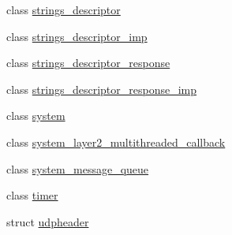 \begin{DoxyCompactItemize}
\item 
class \hyperlink{classavdecc__lib_1_1strings__descriptor}{strings\+\_\+descriptor}
\item 
class \hyperlink{classavdecc__lib_1_1strings__descriptor__imp}{strings\+\_\+descriptor\+\_\+imp}
\item 
class \hyperlink{classavdecc__lib_1_1strings__descriptor__response}{strings\+\_\+descriptor\+\_\+response}
\item 
class \hyperlink{classavdecc__lib_1_1strings__descriptor__response__imp}{strings\+\_\+descriptor\+\_\+response\+\_\+imp}
\item 
class \hyperlink{classavdecc__lib_1_1system}{system}
\item 
class \hyperlink{classavdecc__lib_1_1system__layer2__multithreaded__callback}{system\+\_\+layer2\+\_\+multithreaded\+\_\+callback}
\item 
class \hyperlink{classavdecc__lib_1_1system__message__queue}{system\+\_\+message\+\_\+queue}
\item 
class \hyperlink{classavdecc__lib_1_1timer}{timer}
\item 
struct \hyperlink{structavdecc__lib_1_1udpheader}{udpheader}
\end{DoxyCompactItemize}
